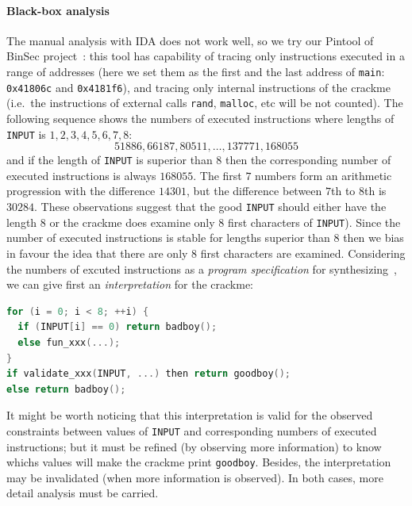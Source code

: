 \documentclass{easychair}
\begin{document}
\paragraph{Black-box analysis}
The manual analysis with IDA does not work well, so we try our Pintool of BinSec project~\autocite{binsec}: this tool has capability of tracing only instructions executed in a range of addresses (here we set them as the first and the last address of \texttt{main}: \texttt{0x41806c} and \texttt{0x4181f6}), and tracing only internal instructions of the crackme (i.e.~the instructions of external calls \texttt{rand}, \texttt{malloc}, etc will be not counted). The following sequence shows the numbers of executed instructions where lengths of \texttt{INPUT} is $1, 2, 3, 4, 5, 6, 7, 8$:
\begin{equation*}
  51886, 66187, 80511, \dots, 137771, 168055
\end{equation*}
and if the length of \texttt{INPUT} is superior than $8$ then the corresponding number of executed instructions is always $168055$. The first $7$ numbers form an arithmetic progression with the difference $14301$, but the difference between $7$th to $8$th is $30284$. These observations suggest that the good \texttt{INPUT} should either have the length $8$ or the crackme does examine only $8$ first characters of \texttt{INPUT}). Since the number of executed instructions is stable for lengths superior than $8$ then we bias in favour the idea that there are only $8$ first characters are examined. Considering the numbers of excuted instructions as a \emph{program specification} for synthesizing~\autocite{GulwaniPPDP102}, we can give first an \emph{interpretation} for the crackme:
\begin{lstlisting}[frame=lines, caption={Synthesizing of the crackme}, captionpos=b, boxpos=b, language={C}, label=lst:synthesis]
for (i = 0; i < 8; ++i) {
  if (INPUT[i] == 0) return badboy();
  else fun_xxx(...);
}
if validate_xxx(INPUT, ...) then return goodboy();
else return badboy();
\end{lstlisting}
It might be worth noticing that this interpretation is valid for the observed constraints between values of \texttt{INPUT} and corresponding numbers of executed instructions; but it must be refined (by observing more information) to know whichs values will make the crackme print \texttt{goodboy}. Besides, the interpretation may be invalidated (when more information is observed). In both cases, more detail analysis must be carried. 
\end{document}
